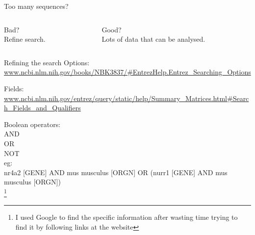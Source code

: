 \documentclass[pdf]{beamer}
\newcommand\blfootnote[1]{%
  \begingroup  %
  \renewcommand\thefootnote{}\footnote{#1}%
  \addtocounter{footnote}{-1}  %
  \endgroup
}
\begin{document}
\begin{frame}{Too many sequences?}
\begin{columns}[t]
  \begin{column}{0.5\textwidth}
    Bad?\\
    \vspace{2ex}
    Refine search.
    \vspace{1ex}
  \end{column}
  \begin{column}{0.5\textwidth}
    Good?\\
    \vspace{2ex}
    Lots of data that can be analysed.
  \end{column}
\end{columns}
\end{frame}


\begin{frame}{Refining the search}
  Options:\\
  { \tiny \href{http://www.ncbi.nlm.nih.gov/books/NBK3837/\#EntrezHelp.Entrez_Searching_Options}{www.ncbi.nlm.nih.gov/books/NBK3837/\#EntrezHelp.Entrez\_Searching\_Options} }
  \par
  Fields:\\
  { \tiny \href{http://www.ncbi.nlm.nih.gov/entrez/query/static/help/Summary_Matrices.html\#Search_Fields_and_Qualifiers}{www.ncbi.nlm.nih.gov/entrez/query/static/help/Summary\_Matrices.html\#Search\_Fields\_and\_Qualifiers} }

  \vspace{0.5cm}
  Boolean operators:\\
  {\setlength{\leftskip}{1cm}\small
    AND\\
    OR\\
    NOT\\
  }
  \vspace{0.5cm}
  eg:\\
  nr4a2 [GENE] AND mus musculus [ORGN] OR (nurr1 [GENE] AND mus musculus [ORGN])\\


  \blfootnote{I used Google to find the specific information after wasting time trying to find it by following links at the website}
\end{frame}
\end{document}
